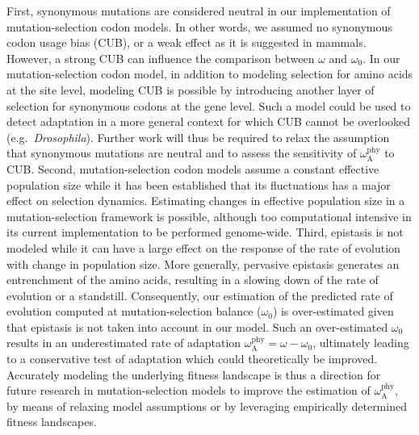 \documentclass[9pt,twocolumn,twoside,lineno]{pnas-new}
\newcommand{\rateApop}{\omega_{\mathrm{A}}}
\newcommand{\rateAphy}{\rateApop^{\mathrm{phy}}}
\begin{document}
First, synonymous mutations are considered neutral in our implementation of mutation-selection codon models.
In other words, we assumed no synonymous codon usage bias (CUB), or a weak effect as it is suggested in mammals\cite{plotkin_synonymous_2011}.
However, a strong CUB can influence the comparison between $\omega$ and $\omega_0$\cite{spielman_relationship_2015}.
In our mutation-selection codon model, in addition to modeling selection for amino acids at the site level, modeling CUB is possible by introducing another layer of selection for synonymous codons at the gene level\cite{yang_mutationselection_2008, rodrigue_mechanistic_2010}.
Such a model could be used to detect adaptation in a more general context for which CUB cannot be overlooked (e.g.~\textit{Drosophila}).
Further work will thus be required to relax the assumption that synonymous mutations are neutral and to assess the sensitivity of $\rateAphy$ to CUB.
Second, mutation-selection codon models assume a constant effective population size while it has been established that its fluctuations has a major effect on selection dynamics\cite{lanfear_population_2014, platt_protein_2018}.
Estimating changes in effective population size in a mutation-selection framework is possible\cite{latrille_inferring_2021}, although too computational intensive in its current implementation to be performed genome-wide.
Third, epistasis is not modeled while it can have a large effect on the response of the rate of evolution with change in population size\cite{latrille_quantifying_2021}.
More generally, pervasive epistasis generates an entrenchment of the amino acids\cite{goldstein_evolutionary_2004, goldstein_nonadaptive_2015, goldstein_sequence_2017}, resulting in a slowing down of the rate of evolution\cite{rodrigue_detecting_2017, patel_epistasis_2022} or a standstill\cite{youssef_evolution_2022}.
Consequently, our estimation of the predicted rate of evolution computed at mutation-selection balance ($\omega_0$) is over-estimated given that epistasis is not taken into account in our model.
Such an over-estimated $\omega_0$ results in an underestimated rate of adaptation $\rateAphy = \omega - \omega_0$, ultimately leading to a conservative test of adaptation which could theoretically be improved.
Accurately modeling the underlying fitness landscape is thus a direction for future research in mutation-selection models to improve the estimation of $\rateAphy$, by means of relaxing model assumptions\cite{goldstein_sequence_2017} or by leveraging empirically determined fitness landscapes\cite{bloom_identification_2017, schrempf_scalable_2020}.
\end{document}
